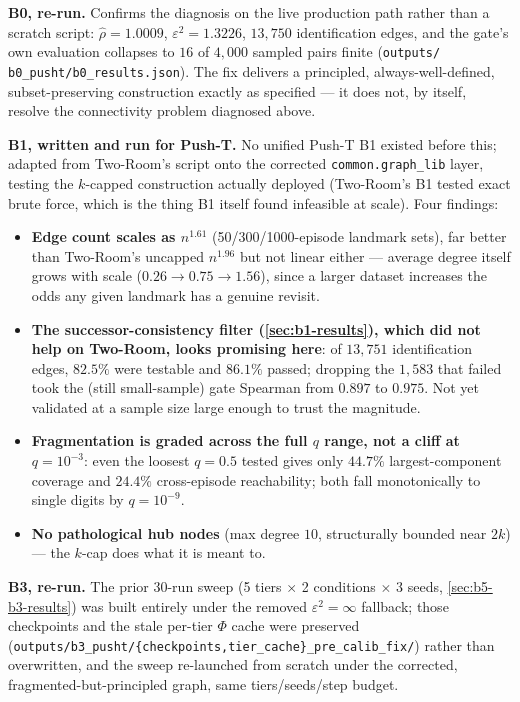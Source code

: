 \documentclass[11pt]{article}
\begin{document}
\textbf{B0, re-run.} Confirms the diagnosis on the live production path rather than a scratch
script: $\hat\rho{=}1.0009$, $\varepsilon^2{=}1.3226$, $13{,}750$ identification edges, and the
gate's own evaluation collapses to $16$ of $4{,}000$ sampled pairs finite (\texttt{outputs/
b0\_pusht/b0\_results.json}). The fix delivers a principled, always-well-defined,
subset-preserving construction exactly as specified --- it does not, by itself, resolve the
connectivity problem diagnosed above.

\textbf{B1, written and run for Push-T.} No unified Push-T B1 existed before this; adapted from
Two-Room's script onto the corrected \texttt{common.graph\_lib} layer, testing the $k$-capped
construction actually deployed (Two-Room's B1 tested exact brute force, which is the thing B1
itself found infeasible at scale). Four findings:
\begin{itemize}[leftmargin=1.4em,itemsep=2pt]
\item \textbf{Edge count scales as $n^{1.61}$} (50/300/1000-episode landmark sets), far better
than Two-Room's uncapped $n^{1.96}$ but not linear either --- average degree itself grows with
scale ($0.26 \to 0.75 \to 1.56$), since a larger dataset increases the odds any given landmark
has a genuine revisit.
\item \textbf{The successor-consistency filter (\cref{sec:b1-results}), which did not help on
Two-Room, looks promising here}: of $13{,}751$ identification edges, $82.5\%$ were testable and
$86.1\%$ passed; dropping the $1{,}583$ that failed took the (still small-sample) gate Spearman
from $0.897$ to $0.975$. Not yet validated at a sample size large enough to trust the magnitude.
\item \textbf{Fragmentation is graded across the full $q$ range, not a cliff at $q{=}10^{-3}$}:
even the loosest $q{=}0.5$ tested gives only $44.7\%$ largest-component coverage and $24.4\%$
cross-episode reachability; both fall monotonically to single digits by $q{=}10^{-9}$.
\item \textbf{No pathological hub nodes} (max degree $10$, structurally bounded near $2k$) ---
the $k$-cap does what it is meant to.
\end{itemize}

\textbf{B3, re-run.} The prior $30$-run sweep (5 tiers $\times$ 2 conditions $\times$ 3 seeds,
\cref{sec:b5-b3-results}) was built entirely under the removed $\varepsilon^2{=}\infty$
fallback; those checkpoints and the stale per-tier $\Phi$ cache were preserved
(\texttt{outputs/b3\_pusht/\{checkpoints,tier\_cache\}\_pre\_calib\_fix/}) rather than
overwritten, and the sweep re-launched from scratch under the corrected, fragmented-but-principled
graph, same tiers/seeds/step budget.
\end{document}
